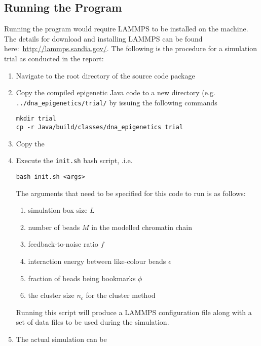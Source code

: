 \subsection{Running the Program}
Running the program would require LAMMPS to be installed on the machine. The details for download and installing LAMMPS can be found here:~\url{http://lammps.sandia.gov/}. The following is the procedure for a simulation trial as conducted in the report:
\begin{enumerate}
\item Navigate to the root directory of the source code package
\item Copy the compiled epigenetic Java code to a new directory (e.g. \texttt{../dna\_epigenetics/trial/} by issuing the following commands
\begin{lstlisting}
mkdir trial
cp -r Java/build/classes/dna_epigenetics trial
\end{lstlisting}
\item Copy the 
\item Execute the \texttt{init.sh} bash script, .i.e.
\begin{lstlisting}
bash init.sh <args>
\end{lstlisting}
The arguments that need to be specified for this code to run is as follows:
\begin{enumerate}[i]
\item simulation box size $L$
\item number of beads $M$ in the modelled chromatin chain
\item feedback-to-noise ratio $f$
\item interaction energy between like-colour beads $\epsilon$
\item fraction of beads being bookmarks $\phi$
\item the cluster size $n_c$ for the cluster method
\end{enumerate}
Running this script will produce a LAMMPS configuration file along with a set of data files to be used during the simulation.
\item The actual simulation can be 
\end{enumerate}

